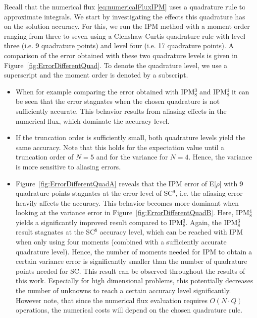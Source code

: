 Recall that the numerical flux \eqref{eq:numericalFluxIPM} uses a quadrature rule to approximate integrals. We start by investigating the effects this quadrature has on the solution accuracy. For this, we run the IPM method with a moment order ranging from three to seven using a Clenshaw-Curtis quadrature rule with level three (i.e. 9 quadrature points) and level four (i.e. 17 quadrature points). A comparison of the error obtained with these two quadrature levels is given in Figure~\ref{fig:ErrorDifferentQuad}. To denote the quadrature level, we use a superscript and the moment order is denoted by a subscript.
\begin{itemize}
\item When for example comparing the error obtained with IPM$_8^3$ and IPM$_8^4$ it can be seen that the error stagnates when the chosen quadrature is not sufficiently accurate. This behavior results from aliasing effects in the numerical flux, which dominate the accuracy level.
\item If the truncation order is sufficiently small, both quadrature levels yield the same accuracy. Note that this holds for the expectation value until a truncation order of $N=5$ and for the variance for $N=4$. Hence, the variance is more sensitive to aliasing errors.
\item Figure~\ref{fig:ErrorDifferentQuadA} reveals that the IPM error of E[$\rho$] with 9 quadrature points stagnates at the error level of SC$^9$, i.e. the aliasing error heavily affects the accuracy. This behavior becomes more dominant when looking at the variance error in Figure~\ref{fig:ErrorDifferentQuadB}. Here, IPM$_8^4$ yields a significantly improved result compared to IPM$_8^3$. Again, the IPM$_8^3$ result stagnates at the SC$^9$ accuracy level, which can be reached with IPM when only using four moments (combined with a sufficiently accurate quadrature level). Hence, the number of moments needed for IPM to obtain a certain variance error is significantly smaller than the number of quadrature points needed for SC. This result can be observed throughout the results of this work. Especially for high dimensional problems, this potentially decreases the number of unknowns to reach a certain accuracy level significantly. However note, that since the numerical flux evaluation requires $O(N\cdot Q)$ operations, the numerical costs will depend on the chosen quadrature rule.
\end{itemize}
